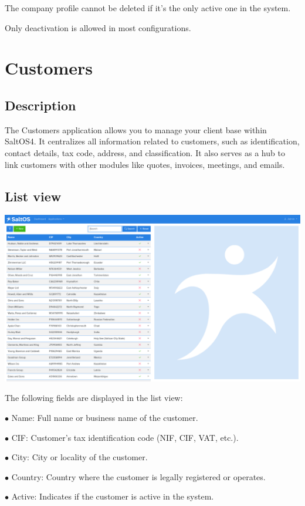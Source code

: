 \documentclass[a4paper]{article}
\begin{document}
The company profile cannot be deleted if it's the only active one in the system.

Only deactivation is allowed in most configurations.


\hypertarget{toc46}{}
\section{Customers}

\hypertarget{toc47}{}
\subsection{Description}

The Customers application allows you to manage your client base within SaltOS4.
It centralizes all information related to customers, such as identification, contact details,
tax code, address, and classification. It also serves as a hub to link customers with other
modules like quotes, invoices, meetings, and emails.

\hypertarget{toc48}{}
\subsection{List view}

\begin{center}\includegraphics[width=1\textwidth]{../ujest/snaps/test-screenshots-js-screenshots-crm-customers-list-en-us-1-snap.png}\end{center}

The following fields are displayed in the list view:

\begin{compactitem}
\item[\color{myblue}$\bullet$] Name: Full name or business name of the customer.
\item[\color{myblue}$\bullet$] CIF: Customer's tax identification code (NIF, CIF, VAT, etc.).
\item[\color{myblue}$\bullet$] City: City or locality of the customer.
\item[\color{myblue}$\bullet$] Country: Country where the customer is legally registered or operates.
\item[\color{myblue}$\bullet$] Active: Indicates if the customer is active in the system.
\end{compactitem}
\end{document}
